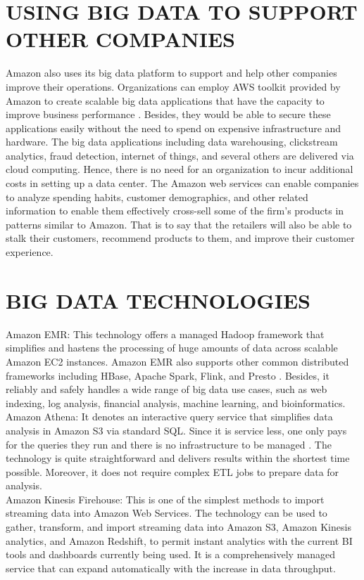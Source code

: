 \documentclass[sigconf]{acmart}
\begin{document}
\section{USING BIG DATA TO SUPPORT OTHER COMPANIES}
Amazon also uses its big data platform to support and help other companies improve their operations. Organizations can employ AWS toolkit provided by Amazon to create scalable big data applications that 
have the capacity to improve business performance \cite{Chen2012}. Besides, they would be able to secure these applications easily without the need to spend on expensive infrastructure and hardware. 
The big data applications including data warehousing, clickstream analytics, fraud detection, internet of things, and several others are delivered via cloud computing. Hence, there is no need for an 
organization to incur additional costs in setting up a data center. The Amazon web services can enable companies to analyze spending habits, customer demographics, and other related information to enable 
them effectively cross-sell some of the firm’s products in patterns similar to Amazon. That is to say that the retailers will also be able to stalk their customers, recommend products to them, and improve 
their customer experience.

\section{BIG DATA TECHNOLOGIES}
Amazon EMR: This technology offers a managed Hadoop framework that simplifies and hastens the processing of huge amounts of data across scalable Amazon EC2 instances. Amazon EMR also supports other common 
distributed frameworks including HBase, Apache Spark, Flink, and Presto \cite{Amazon2017}.  Besides, it reliably and safely handles a wide range of big data use cases, such as web indexing, log analysis, 
financial analysis, machine learning, and bioinformatics. \\
Amazon Athena: It denotes an interactive query service that simplifies data analysis in Amazon S3 via standard SQL. Since it is service less, one only pays for the queries they run and there is no infrastructure 
to be managed \cite{Amazon2017}. The technology is quite straightforward and delivers results within the shortest time possible. Moreover, it does not require complex ETL jobs to prepare data for analysis. \\
Amazon Kinesis Firehouse: This is one of the simplest methods to import streaming data into Amazon Web Services. The technology can be used to gather, transform, and import streaming data into Amazon S3, 
Amazon Kinesis analytics, and Amazon Redshift, to permit instant analytics with the current BI tools and dashboards currently being used.  It is a comprehensively managed service that can expand automatically 
with the increase in data throughput. 
\end{document}
